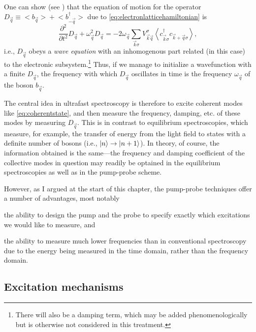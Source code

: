 One can show (see \citet{kuznetsov_theory_1994}) that the equation of motion for the operator $D_{\vec{q}}\equiv \big<b_{\vec{q}}\big>+\big<b^\dagger_{-\vec{q}}\big>$ due to \cref{eq:electronlatticehamiltonian} is
\begin{equation}\label{eq:coherentoscillationwaveequation}
\frac{\partial^2}{\partial t^2}D_{\vec{q}}+\omega^2_{\vec{q}}D_{\vec{q}} = -2\omega_{\vec{q}}\sum_{\vec{k}\sigma}V^\sigma_{\vec{k}\vec{q}}\left<c^\dagger_{\vec{k}\sigma} c_{\vec{k}+\vec{q}\sigma}\right>,
\end{equation}
i.e., $D_{\vec{q}}$ obeys a \emph{wave equation} with an inhomogenous part related (in this case) to the electronic subsystem.\footnote{There will also be a damping term, which may be added phenomenologically but is otherwise not considered in this treatment.}
Thus, if we manage to initialize a wavefunction with a finite $D_{\vec{q}}$, the frequency with which $D_{\vec{q}}$ oscillates in time is the frequency $\omega_{\vec{q}}$ of the boson $b_{\vec{q}}$.

The central idea in ultrafast spectroscopy is therefore to excite coherent modes like \cref{eq:coherentstate}, and then measure the frequency, damping, etc. of these modes by measuring $D_{\vec{q}}$.
This is in contrast to equilibrium spectroscopies, which measure, for example, the transfer of energy from the light field to states with a definite number of bosons (i.e., $\ket{n}\rightarrow\ket{n+1}$).
In theory, of course, the information obtained is the same---the frequency and damping coefficient of the collective modes in question may readily be optained in the equilibrium spectroscopies as well as in the pump-probe scheme.
\begin{enumerate*}[label=(\roman*)]\item[] However, as I argued at the start of this chapter, the pump-probe techniques offer a number of advantages, most notably \item the ability to design the pump and the probe to specify exactly which excitations we would like to measure, and \item the ability to measure much lower frequencies than in conventional spectroscopy due to the energy being measured in the time domain, rather than the frequency domain.\end{enumerate*}

\subsection{Excitation mechanisms}

